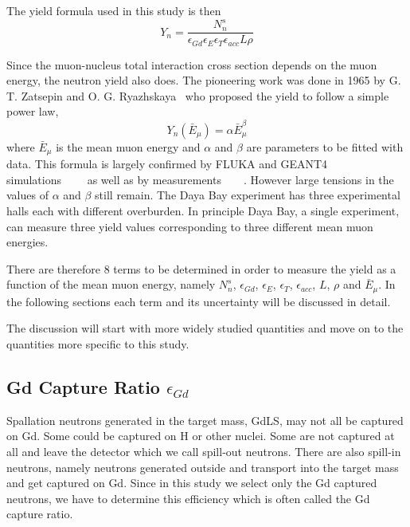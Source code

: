 \documentclass[paper=a4, fontsize=12pt, toc=left]{scrartcl} %
\numberwithin{equation}{section} %
\numberwithin{figure}{section} %
\numberwithin{table}{section} %
\begin{document}
The yield formula used in this study is then
\begin{equation}
	\boxed{Y_n=\frac{N_n^s}{\epsilon_{Gd}\epsilon_E\epsilon_T\epsilon_{acc}L\rho}}
\end{equation}

Since the muon-nucleus total interaction cross section depends on the muon energy, the neutron yield also does. The pioneering work was done in 1965 by G. T. Zatsepin and O. G. Ryazhskaya~\cite{Zatsepin1965} who proposed the yield to follow a simple power law,
\begin{equation}
  \boxed{Y_n(\bar{E}_\mu)=\alpha\bar{E}_\mu^\beta}
\end{equation}
where $\bar{E}_\mu$ is the mean muon energy and $\alpha$ and $\beta$ are parameters to be fitted with data. This formula is largely confirmed by FLUKA and GEANT4 simulations~\cite{Wang2001}~\cite{Araujo2005}~\cite{Mei2006}~\cite{Malgin2008} as well as by measurements~\cite{Gorshkov1971}~\cite{Bezrukov1973}~\cite{Enikeev1987}~\cite{Aglietta1989}. However large tensions in the values of $\alpha$ and $\beta$ still remain. The Daya Bay experiment has three experimental halls each with different overburden. In principle Daya Bay, a single experiment, can measure three yield values corresponding to three different mean muon energies.

There are therefore 8 terms to be determined in order to measure the yield as a function of the mean muon energy, namely $N_n^s$, $\epsilon_{Gd}$, $\epsilon_E$, $\epsilon_T$, $\epsilon_{acc}$, $L$, $\rho$ and $\bar{E}_\mu$. In the following sections each term and its uncertainty will be discussed in detail.

The discussion will start with more widely studied quantities and move on to the quantities more specific to this study.

\subsection{Gd Capture Ratio \texorpdfstring{$\epsilon_{Gd}$}{epsilon Gd}}
Spallation neutrons generated in the target mass, GdLS, may not all be captured on Gd. Some could be captured on H or other nuclei. Some are not captured at all and leave the detector which we call spill-out neutrons. There are also spill-in neutrons, namely neutrons generated outside and transport into the target mass and get captured on Gd. Since in this study we select only the Gd captured neutrons, we have to determine this efficiency which is often called the Gd capture ratio.
\end{document}

